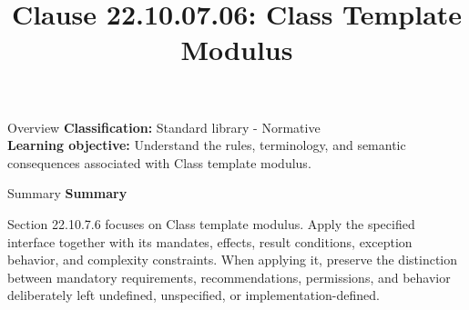 \documentclass[10pt,letterpaper]{article}
\title{Clause 22.10.07.06: Class Template Modulus}
\author{}
\date{}
\begin{document}
\maketitle
\begin{CornellOverviewBox}{Overview}
\textbf{Classification:} Standard library - Normative\\[2pt]
\textbf{Learning objective:} Understand the rules, terminology, and semantic consequences associated with Class template modulus.
\end{CornellOverviewBox}\begin{CornellSummaryBox}{Summary}
{\sffamily\bfseries\color{Accent} Summary}\par\vspace{3pt}Section 22.10.7.6 focuses on Class template modulus. Apply the specified interface together with its mandates, effects, result conditions, exception behavior, and complexity constraints. When applying it, preserve the distinction between mandatory requirements, recommendations, permissions, and behavior deliberately left undefined, unspecified, or implementation-defined.
\end{CornellSummaryBox}
\end{document}
